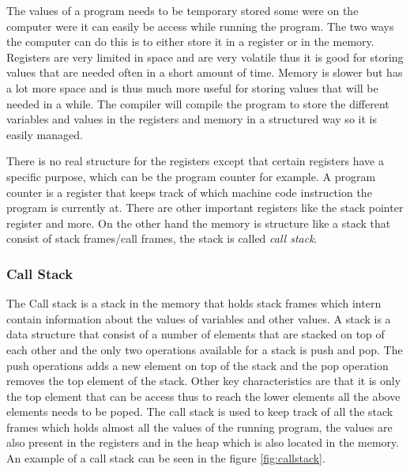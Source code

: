  

The values of a program needs to be temporary stored some were on the computer were it can easily be access while running the program.
The two ways the computer can do this is to either store it in a register or in the memory.
Registers are very limited in space and are very volatile thus it is good for storing values that are needed often in a short amount of time.
Memory is slower but has a lot more space and is thus much more useful for storing values that will be needed in a while.
The compiler will compile the program to store the different variables and values in the registers and memory in a structured way so it is easily managed.

There is no real structure for the registers except that certain registers have a specific purpose, which can be the program counter for example.
A program counter is a register that keeps track of which machine code instruction the program is currently at.
There are other important registers like the stack pointer register and more.
On the other hand the memory is structure like a stack that consist of stack frames/call frames, the stack is called \emph{call stack}.


\subsubsection{Call Stack}
The Call stack is a stack in the memory that holds stack frames which intern contain information about the values of variables and other values.
A stack is a data structure that consist of a number of elements that are stacked on top of each other and the only two operations available for a stack is push and pop.
The push operations adds a new element on top of the stack and the pop operation removes the top element of the stack.
Other key characteristics are that it is only the top element that can be access thus to reach the lower elements all the above elements needs to be poped.
The call stack is used to keep track of all the stack frames which holds almost all the values of the running program, the values are also present in the registers and in the heap which is also located in the memory.
An example of a call stack can be seen in the figure \ref{fig:callstack}.


